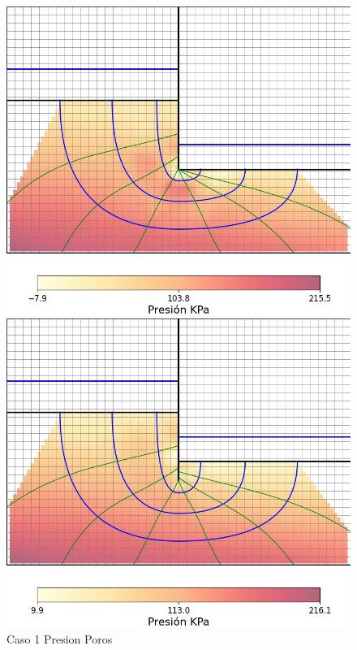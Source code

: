 \begin{figure}[H]
    \centering
    \begin{minipage}{0.32\textwidth}
        \centering
        \includegraphics[width=\textwidth]{GRAFICOS/caso_1_presion_poros.jpg}
        \caption{Caso 1 Presion Poros}
    \end{minipage}
    \begin{minipage}{0.32\textwidth}
        \centering
        \includegraphics[width=\textwidth]{GRAFICOS/caso_2_presion_poros.jpg}

\end{minipage}
\end{figure}
